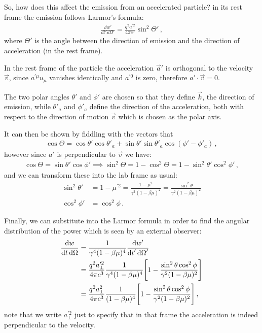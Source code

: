 \documentclass[main.tex]{subfiles}
\begin{document}
So, how does this affect the emission from an accelerated particle? in its rest frame the emission follows Larmor's formula: 
%
\begin{align}
\frac{ \dd{w'}}{ \dd{t'} \dd{\Omega '}} = \frac{q^2 a^{\prime 2}}{4 \pi c^3} \sin^2 \Theta '
\,,
\end{align}
%
where \(\Theta' \) is the angle between the direction of emission and the direction of acceleration (in the rest frame). 

In the rest frame of the particle the acceleration \(\vec{a}'\) is orthogonal to the velocity \(\vec{v}\), since \(a^{\prime \mu } u_{\mu }\) vanishes identically and \(a^{\prime 0}\) is zero, therefore \(a' \cdot \vec{v} = 0\). 

The two polar angles \(\theta '\) and \(\phi '\) are chosen so that they define \(\vec{k}\), the direction of emission, while \(\theta'_a\) and \(\phi '_a\) define the direction of the acceleration, both with respect to the direction of motion \(\vec{v}\) which is chosen as the polar axis. 

It can then be shown by fiddling with the vectors that 
%
\begin{align}
\cos \Theta = \cos \theta ' \cos \theta '_a + \sin \theta' \sin \theta '_a \cos(\phi ' - \phi '_a)
\,,
\end{align}
%
however since \(a'\) is perpendicular to \(\vec{v}\) we have:
%
\begin{align}
\cos \Theta = \sin \theta ' \cos \phi '
\implies \sin^2 \Theta = 1 - \cos^2 \Theta = 1 - \sin^2 \theta ' \cos^2 \phi '
\,,
\end{align}
%
and we can transform these into the lab frame as usual: 
%
\begin{align}
\sin^2 \theta ' &= 1 - \mu^{\prime 2 } = \frac{1 - \mu^2}{\gamma^2 ( 1- \beta\mu)^2} = \frac{\sin^2 \theta }{\gamma^2 (1 - \beta \mu )^2}  \\
\cos^2 \phi ' &= \cos^2 \phi 
\,.
\end{align}

Finally, we can substitute into the Larmor formula in order to find the angular distribution of the power which is seen by an external observer: 
%
\begin{align}
\frac{ \dd{w}}{ \dd{t} \dd{\Omega }}
&= \frac{1}{\gamma^{4} (1 - \beta \mu )^{4}}
\frac{ \dd{w'}}{ \dd{t}' \dd{\Omega }' }  \\
&= \frac{q^2 a^{\prime 2}_\perp}{4 \pi c^3}
\frac{1}{\gamma^{4} (1 - \beta \mu )^4}
\qty[1 - \frac{\sin^2 \theta  \cos^2\phi }{\gamma^2(1 - \beta \mu )^2}]  \\
&= \frac{q^2 a^{2}_\perp}{4 \pi c^3}
\frac{1}{ (1 - \beta \mu )^4}
\qty[1 - \frac{\sin^2 \theta  \cos^2\phi }{\gamma^2(1 - \beta \mu )^2}]  
\,,
\end{align}
%
note that we write \(a^{\prime 2}_\perp  \) just to specify that in that frame the acceleration is indeed perpendicular to the velocity.
\end{document}
